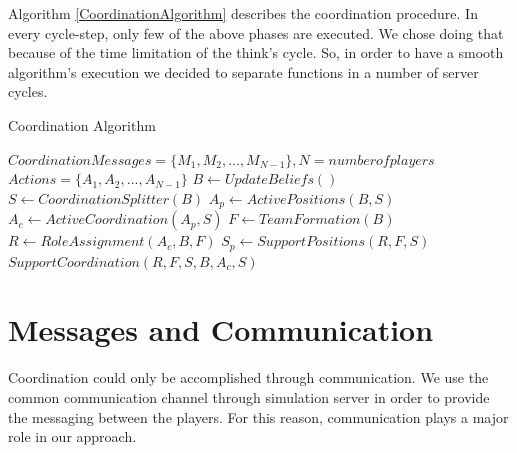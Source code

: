 Algorithm \ref{CoordinationAlgorithm} describes the coordination procedure. In every cycle-step, only few of the above phases are executed. We chose doing that because of the time limitation of the think's cycle. So, in order to have a smooth algorithm's execution we decided to separate functions in a number of server cycles.
\begin{algorithm}[htb!]
\caption{Coordination Algorithm }
\label{CoordinationAlgorithm}
\begin{algorithmic}[1]
$Coordination Messages = \lbrace M_{1},M_{2},...,M_{N-1} \rbrace, N = number of players $
$Actions = \lbrace A_{1},A_{2},...,A_{N-1} \rbrace$
\STATE $B \leftarrow Update Beliefs() $
\STATE $S \leftarrow Coordination Splitter(B) $
\STATE $A_{p} \leftarrow Active Positions(B,S) $
\STATE $A_{c} \leftarrow Active Coordination(A_{p},S) $
\STATE $ F \leftarrow TeamFormation(B) $
\STATE $ R \leftarrow Role Assignment(A_{c},B,F) $
\STATE $ S_{p} \leftarrow Support Positions(R,F,S) $
\STATE $ Support Coordination(R,F,S,B,A_{c},S) $
\ENDIF
\end{algorithmic}
\end{algorithm}


\section{Messages and Communication}
Coordination could only be accomplished through communication. We use the common communication channel through simulation server in order to provide the messaging between the players. For this reason, communication plays a major role in our approach. 

